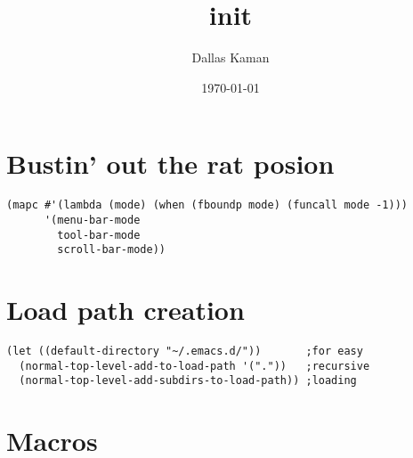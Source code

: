 \documentclass[11pt]{article}
\title{init}
\author{Dallas Kaman}
\date{\today}
\begin{document}
\maketitle

\setcounter{tocdepth}{3}
\tableofcontents
\vspace*{1cm}

\section{Bustin' out the rat posion}
\label{sec-1}


\begin{verbatim}
(mapc #'(lambda (mode) (when (fboundp mode) (funcall mode -1)))
      '(menu-bar-mode
        tool-bar-mode
        scroll-bar-mode))
\end{verbatim}
\section{Load path creation}
\label{sec-2}


\begin{verbatim}
(let ((default-directory "~/.emacs.d/"))       ;for easy
  (normal-top-level-add-to-load-path '("."))   ;recursive
  (normal-top-level-add-subdirs-to-load-path)) ;loading
\end{verbatim}
\section{Macros}
\label{sec-3}
\end{document}

